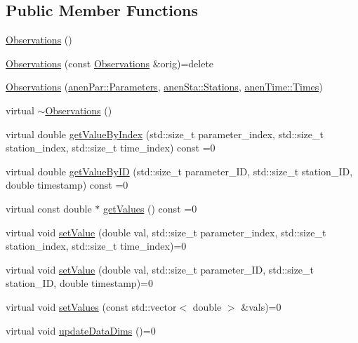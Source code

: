 \subsection*{Public Member Functions}
\begin{DoxyCompactItemize}
\item 
\mbox{\hyperlink{class_observations_a80e66bee67e5e5eb41aa60b6d6f71544}{Observations}} ()
\item 
\mbox{\hyperlink{class_observations_a579feccdac9c26226cf813ac8cf3521a}{Observations}} (const \mbox{\hyperlink{class_observations}{Observations}} \&orig)=delete
\item 
\mbox{\hyperlink{class_observations_acd73489a964b9794e0a265ce394d6f17}{Observations}} (\mbox{\hyperlink{classanen_par_1_1_parameters}{anen\+Par\+::\+Parameters}}, \mbox{\hyperlink{classanen_sta_1_1_stations}{anen\+Sta\+::\+Stations}}, \mbox{\hyperlink{classanen_time_1_1_times}{anen\+Time\+::\+Times}})
\item 
virtual \mbox{\hyperlink{class_observations_a8724b267cce796b0f77f8f2b9e4aaf1d}{$\sim$\+Observations}} ()
\item 
virtual double \mbox{\hyperlink{class_observations_a85358b5d09f0ea02e27e06be09501cec}{get\+Value\+By\+Index}} (std\+::size\+\_\+t parameter\+\_\+index, std\+::size\+\_\+t station\+\_\+index, std\+::size\+\_\+t time\+\_\+index) const =0
\item 
virtual double \mbox{\hyperlink{class_observations_a0da5d441448944fb88841b8883f823b7}{get\+Value\+By\+ID}} (std\+::size\+\_\+t parameter\+\_\+\+ID, std\+::size\+\_\+t station\+\_\+\+ID, double timestamp) const =0
\item 
virtual const double $\ast$ \mbox{\hyperlink{class_observations_aa626ffb450b4647e1291053dd5b6d03c}{get\+Values}} () const =0
\item 
virtual void \mbox{\hyperlink{class_observations_a6f00b4a2277ce9e77cd0d5975f4066f8}{set\+Value}} (double val, std\+::size\+\_\+t parameter\+\_\+index, std\+::size\+\_\+t station\+\_\+index, std\+::size\+\_\+t time\+\_\+index)=0
\item 
virtual void \mbox{\hyperlink{class_observations_a6ec8166ad0f141e23a07847ab3646a61}{set\+Value}} (double val, std\+::size\+\_\+t parameter\+\_\+\+ID, std\+::size\+\_\+t station\+\_\+\+ID, double timestamp)=0
\item 
virtual void \mbox{\hyperlink{class_observations_a3aaf49cad714ff61c105d26b4b083ac3}{set\+Values}} (const std\+::vector$<$ double $>$ \&vals)=0
\item 
virtual void \mbox{\hyperlink{class_observations_aab0540879c2d3fdf5f91d30ea2f902fd}{update\+Data\+Dims}} ()=0

\end{DoxyCompactItemize}

